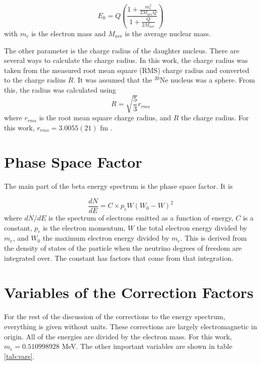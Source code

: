 \documentclass[../MaxHughesThesis.tex]{subfiles}
\begin{document}
\begin{equation}
	E_{0} = Q \left( \frac{1 + \frac{m_{e}^{2}}{2M_{ave} Q}}{1 + \frac{Q}{2M_{ave}}} \right)
	\label{eq:recoilqval}
\end{equation} 
with $m_{e}$ is the electron mass and $M_{ave}$ is the average nuclear mass. 

The other parameter is the charge radius of the daughter nucleus.
There are several ways to calculate the charge radius.
In this work, the charge radius was taken from the measured root mean square (RMS) charge radius and converted to the charge radius $R$.
It was assumed that the $^{20}$Ne nucleus was a sphere. 
From this, the radius was calculated using %
\begin{equation}
	R = \sqrt{\frac{5}{3}}r_{rms}	
	\label{eq:sphereeq}
\end{equation}
where $r_{rms}$ is the root mean square charge radius, and $R$ the charge radius.
For this work, $r_{rms} = 3.0055 (21)$ fm \cite{Ang13}.

\section{Phase Space Factor}
The main part of the beta energy spectrum is the phase space factor.
It is %

\begin{equation}
	\frac{dN}{dE} = C \times p_{e}W(W_{0} - W)^{2}
	\label{eq:phase_space}
\end{equation}
where $dN/dE$ is the spectrum of electrons emitted as a function of energy, $C$ is a constant, $p_{e}$ is the electron momentum, $W$ the total electron energy divided by $m_{e}$, and $W_{0}$ the maximum electron energy divided by $m_{e}$.
This is derived from the density of states of the particle when the neutrino degrees of freedom are integrated over.
The constant has factors that come from that integration.

\section{Variables of the Correction Factors}

For the rest of the discussion of the corrections to the energy spectrum, everything is given without units.
These corrections are largely electromagnetic in origin.
All of the energies are divided by the electron mass.
For this work, $m_{e} = 0.510998928$ MeV.
The other important variables are shown in table \ref{tab:vars}.
\end{document}

